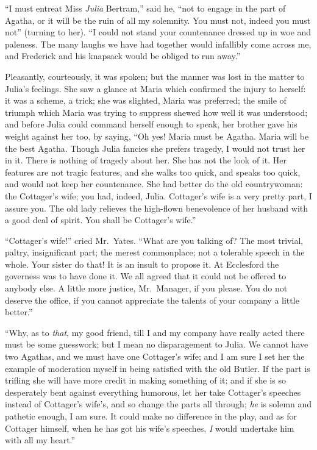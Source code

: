 ``I must entreat Miss \emph{Julia} Bertram,'' said he, ``not to
engage in the part of Agatha, or it will be the ruin
of all my solemnity.  You must not, indeed you must not''
(turning to her). ``I could not stand your countenance
dressed up in woe and paleness.  The many laughs we have
had together would infallibly come across me, and Frederick
and his knapsack would be obliged to run away.''

Pleasantly, courteously, it was spoken; but the
manner was lost in the matter to Julia's feelings.
She saw a glance at Maria which confirmed the injury
to herself:  it was a scheme, a trick; she was slighted,
Maria was preferred; the smile of triumph which Maria
was trying to suppress shewed how well it was understood;
and before Julia could command herself enough to speak,
her brother gave his weight against her too, by saying,
``Oh yes!  Maria must be Agatha.  Maria will be the
best Agatha.  Though Julia fancies she prefers tragedy,
I would not trust her in it.  There is nothing of tragedy
about her.  She has not the look of it.  Her features
are not tragic features, and she walks too quick,
and speaks too quick, and would not keep her countenance.
She had better do the old countrywoman:  the Cottager's wife;
you had, indeed, Julia.  Cottager's wife is a very pretty part,
I assure you.  The old lady relieves the high-flown
benevolence of her husband with a good deal of spirit.
You shall be Cottager's wife.''

``Cottager's wife!'' cried Mr.\ Yates.  ``What are you
talking of?  The most trivial, paltry, insignificant part;
the merest commonplace; not a tolerable speech in the whole.
Your sister do that!  It is an insult to propose it.
At Ecclesford the governess was to have done it.
We all agreed that it could not be offered to anybody else.
A little more justice, Mr.\ Manager, if you please.
You do not deserve the office, if you cannot appreciate
the talents of your company a little better.''

``Why, as to \emph{that}, my good friend, till I and my company
have really acted there must be some guesswork; but I mean
no disparagement to Julia.  We cannot have two Agathas,
and we must have one Cottager's wife; and I am sure I set
her the example of moderation myself in being satisfied
with the old Butler.  If the part is trifling she will
have more credit in making something of it; and if she
is so desperately bent against everything humorous,
let her take Cottager's speeches instead of Cottager's
wife's, and so change the parts all through; \emph{he} is
solemn and pathetic enough, I am sure.  It could make
no difference in the play, and as for Cottager himself,
when he has got his wife's speeches, \emph{I} would undertake
him with all my heart.''


